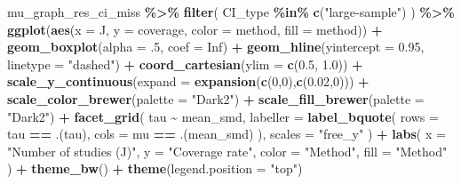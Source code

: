 \documentclass[
]{article}
\newenvironment{Shaded}{\begin{snugshade}}{\end{snugshade}}
\newcommand{\AttributeTok}[1]{\textcolor[rgb]{0.13,0.29,0.53}{#1}}
\newcommand{\ConstantTok}[1]{\textcolor[rgb]{0.56,0.35,0.01}{#1}}
\newcommand{\DecValTok}[1]{\textcolor[rgb]{0.00,0.00,0.81}{#1}}
\newcommand{\FloatTok}[1]{\textcolor[rgb]{0.00,0.00,0.81}{#1}}
\newcommand{\FunctionTok}[1]{\textcolor[rgb]{0.13,0.29,0.53}{\textbf{#1}}}
\newcommand{\NormalTok}[1]{#1}
\newcommand{\SpecialCharTok}[1]{\textcolor[rgb]{0.81,0.36,0.00}{\textbf{#1}}}
\newcommand{\StringTok}[1]{\textcolor[rgb]{0.31,0.60,0.02}{#1}}
\begin{document}
\begin{Shaded}
\begin{Highlighting}[]
\NormalTok{mu\_graph\_res\_ci\_miss }\SpecialCharTok{\%\textgreater{}\%}
  \FunctionTok{filter}\NormalTok{(}
\NormalTok{    CI\_type }\SpecialCharTok{\%in\%} \FunctionTok{c}\NormalTok{(}\StringTok{"large{-}sample"}\NormalTok{)}
\NormalTok{  ) }\SpecialCharTok{\%\textgreater{}\%}
  \FunctionTok{ggplot}\NormalTok{(}\FunctionTok{aes}\NormalTok{(}\AttributeTok{x =}\NormalTok{ J, }\AttributeTok{y =}\NormalTok{ coverage, }\AttributeTok{color =}\NormalTok{ method, }\AttributeTok{fill =}\NormalTok{ method)) }\SpecialCharTok{+}
  \FunctionTok{geom\_boxplot}\NormalTok{(}\AttributeTok{alpha =}\NormalTok{ .}\DecValTok{5}\NormalTok{, }\AttributeTok{coef =} \ConstantTok{Inf}\NormalTok{) }\SpecialCharTok{+}
  \FunctionTok{geom\_hline}\NormalTok{(}\AttributeTok{yintercept =} \FloatTok{0.95}\NormalTok{, }\AttributeTok{linetype =} \StringTok{"dashed"}\NormalTok{) }\SpecialCharTok{+}
  \FunctionTok{coord\_cartesian}\NormalTok{(}\AttributeTok{ylim =} \FunctionTok{c}\NormalTok{(}\FloatTok{0.5}\NormalTok{, }\FloatTok{1.0}\NormalTok{)) }\SpecialCharTok{+} 
  \FunctionTok{scale\_y\_continuous}\NormalTok{(}\AttributeTok{expand =} \FunctionTok{expansion}\NormalTok{(}\FunctionTok{c}\NormalTok{(}\DecValTok{0}\NormalTok{,}\DecValTok{0}\NormalTok{),}\FunctionTok{c}\NormalTok{(}\FloatTok{0.02}\NormalTok{,}\DecValTok{0}\NormalTok{))) }\SpecialCharTok{+} 
  \FunctionTok{scale\_color\_brewer}\NormalTok{(}\AttributeTok{palette =} \StringTok{"Dark2"}\NormalTok{) }\SpecialCharTok{+}
  \FunctionTok{scale\_fill\_brewer}\NormalTok{(}\AttributeTok{palette =} \StringTok{"Dark2"}\NormalTok{) }\SpecialCharTok{+}
  \FunctionTok{facet\_grid}\NormalTok{(}
\NormalTok{    tau }\SpecialCharTok{\textasciitilde{}}\NormalTok{ mean\_smd, }
    \AttributeTok{labeller =} \FunctionTok{label\_bquote}\NormalTok{(}
      \AttributeTok{rows =}\NormalTok{ tau }\SpecialCharTok{==}\NormalTok{ .(tau),}
      \AttributeTok{cols =}\NormalTok{ mu }\SpecialCharTok{==}\NormalTok{ .(mean\_smd)}
\NormalTok{    ),}
    \AttributeTok{scales =} \StringTok{"free\_y"}
\NormalTok{  ) }\SpecialCharTok{+}
  \FunctionTok{labs}\NormalTok{(}
    \AttributeTok{x =} \StringTok{"Number of studies (J)"}\NormalTok{, }
    \AttributeTok{y =} \StringTok{"Coverage rate"}\NormalTok{, }
    \AttributeTok{color =} \StringTok{"Method"}\NormalTok{,}
    \AttributeTok{fill =} \StringTok{"Method"}
\NormalTok{  ) }\SpecialCharTok{+} 
  \FunctionTok{theme\_bw}\NormalTok{() }\SpecialCharTok{+}
  \FunctionTok{theme}\NormalTok{(}\AttributeTok{legend.position =} \StringTok{"top"}\NormalTok{)}
\end{Highlighting}
\end{Shaded}
\end{document}
